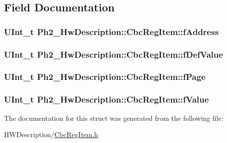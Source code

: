 \subsection{Field Documentation}
\hypertarget{struct_ph2___hw_description_1_1_cbc_reg_item_a2951ae4efa316ed997e28c54a0e786de}{
\subsubsection[{f\-Address}]{\setlength{\rightskip}{0pt plus 5cm}U\-Int\-\_\-t Ph2\-\_\-\-Hw\-Description\-::\-Cbc\-Reg\-Item\-::f\-Address}}\label{struct_ph2___hw_description_1_1_cbc_reg_item_a2951ae4efa316ed997e28c54a0e786de}
\hypertarget{struct_ph2___hw_description_1_1_cbc_reg_item_a80499ef154b03c99b1a5e0eb364ec5b6}{
\subsubsection[{f\-Def\-Value}]{\setlength{\rightskip}{0pt plus 5cm}U\-Int\-\_\-t Ph2\-\_\-\-Hw\-Description\-::\-Cbc\-Reg\-Item\-::f\-Def\-Value}}\label{struct_ph2___hw_description_1_1_cbc_reg_item_a80499ef154b03c99b1a5e0eb364ec5b6}
\hypertarget{struct_ph2___hw_description_1_1_cbc_reg_item_a068f75bd0c65172b6ebb413f3508b818}{
\subsubsection[{f\-Page}]{\setlength{\rightskip}{0pt plus 5cm}U\-Int\-\_\-t Ph2\-\_\-\-Hw\-Description\-::\-Cbc\-Reg\-Item\-::f\-Page}}\label{struct_ph2___hw_description_1_1_cbc_reg_item_a068f75bd0c65172b6ebb413f3508b818}
\hypertarget{struct_ph2___hw_description_1_1_cbc_reg_item_a9571d808e85f74e23fc55bf06a1c803e}{
\subsubsection[{f\-Value}]{\setlength{\rightskip}{0pt plus 5cm}U\-Int\-\_\-t Ph2\-\_\-\-Hw\-Description\-::\-Cbc\-Reg\-Item\-::f\-Value}}\label{struct_ph2___hw_description_1_1_cbc_reg_item_a9571d808e85f74e23fc55bf06a1c803e}


The documentation for this struct was generated from the following file\-:\begin{DoxyCompactItemize}
\item 
H\-W\-Description/\hyperlink{_cbc_reg_item_8h}{Cbc\-Reg\-Item.\-h}\end{DoxyCompactItemize}
